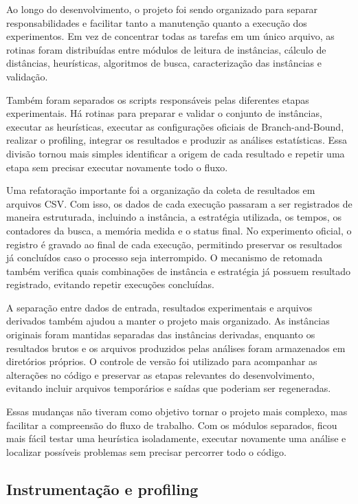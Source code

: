 \documentclass[12pt]{article}
\begin{document}
Ao longo do desenvolvimento, o projeto foi sendo organizado para separar responsabilidades e facilitar tanto a manutenção quanto a execução dos experimentos. Em vez de concentrar todas as tarefas em um único arquivo, as rotinas foram distribuídas entre módulos de leitura de instâncias, cálculo de distâncias, heurísticas, algoritmos de busca, caracterização das instâncias e validação.

Também foram separados os scripts responsáveis pelas diferentes etapas experimentais. Há rotinas para preparar e validar o conjunto de instâncias, executar as heurísticas, executar as configurações oficiais de Branch-and-Bound, realizar o profiling, integrar os resultados e produzir as análises estatísticas. Essa divisão tornou mais simples identificar a origem de cada resultado e repetir uma etapa sem precisar executar novamente todo o fluxo.

Uma refatoração importante foi a organização da coleta de resultados em arquivos CSV. Com isso, os dados de cada execução passaram a ser registrados de maneira estruturada, incluindo a instância, a estratégia utilizada, os tempos, os contadores da busca, a memória medida e o status final. No experimento oficial, o registro é gravado ao final de cada execução, permitindo preservar os resultados já concluídos caso o processo seja interrompido. O mecanismo de retomada também verifica quais combinações de instância e estratégia já possuem resultado registrado, evitando repetir execuções concluídas.

A separação entre dados de entrada, resultados experimentais e arquivos derivados também ajudou a manter o projeto mais organizado. As instâncias originais foram mantidas separadas das instâncias derivadas, enquanto os resultados brutos e os arquivos produzidos pelas análises foram armazenados em diretórios próprios. O controle de versão foi utilizado para acompanhar as alterações no código e preservar as etapas relevantes do desenvolvimento, evitando incluir arquivos temporários e saídas que poderiam ser regeneradas.

Essas mudanças não tiveram como objetivo tornar o projeto mais complexo, mas facilitar a compreensão do fluxo de trabalho. Com os módulos separados, ficou mais fácil testar uma heurística isoladamente, executar novamente uma análise e localizar possíveis problemas sem precisar percorrer todo o código.

\subsection{Instrumentação e profiling}
\end{document}
